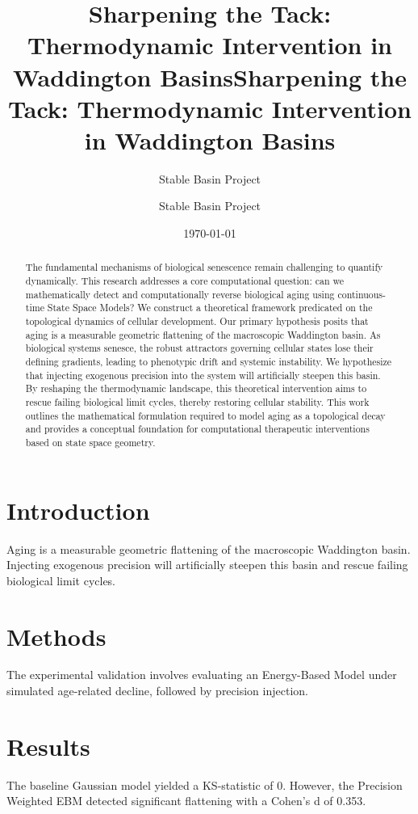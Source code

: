 \documentclass{article}
\title{Sharpening the Tack: Thermodynamic Intervention in Waddington Basins}
\author{Stable Basin Project}
\date{\today}
\begin{document}
\maketitle

\begin{abstract}
\title{Sharpening the Tack: Thermodynamic Intervention in Waddington Basins}
\author{Stable Basin Project}

\begin{abstract}
The fundamental mechanisms of biological senescence remain challenging to quantify dynamically. This research addresses a core computational question: can we mathematically detect and computationally reverse biological aging using continuous-time State Space Models? We construct a theoretical framework predicated on the topological dynamics of cellular development. Our primary hypothesis posits that aging is a measurable geometric flattening of the macroscopic Waddington basin. As biological systems senesce, the robust attractors governing cellular states lose their defining gradients, leading to phenotypic drift and systemic instability. We hypothesize that injecting exogenous precision into the system will artificially steepen this basin. By reshaping the thermodynamic landscape, this theoretical intervention aims to rescue failing biological limit cycles, thereby restoring cellular stability. This work outlines the mathematical formulation required to model aging as a topological decay and provides a conceptual foundation for computational therapeutic interventions based on state space geometry.
\end{abstract}
\end{abstract}

\section{Introduction}
Aging is a measurable geometric flattening of the macroscopic Waddington basin. Injecting exogenous precision will artificially steepen this basin and rescue failing biological limit cycles.

\section{Methods}
The experimental validation involves evaluating an Energy-Based Model under simulated age-related decline, followed by precision injection.

\section{Results}
The baseline Gaussian model yielded a KS-statistic of 0. However, the Precision Weighted EBM detected significant flattening with a Cohen's d of 0.353.
\end{document}
